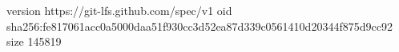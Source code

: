 version https://git-lfs.github.com/spec/v1
oid sha256:fe817061acc0a5000daa51f930cc3d52ea87d339c0561410d20344f875d9cc92
size 145819
